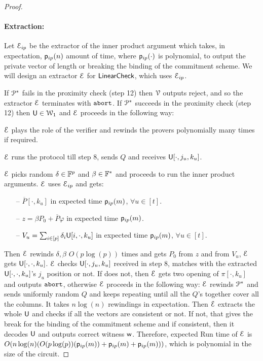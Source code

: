 \begin{proof}
	\smallskip
	\paragraph*{Extraction:} Let $\mathcal{E}_{ip}$ be the extractor of the inner product argument which takes, in expectation, $\mathsf{p}_{ip}(n)$ amount of time, where $\mathsf{p}_{ip}(\cdot)$ is polynomial, to output the private vector of length or breaking the binding of the commitment scheme. We will design an extractor $\mathcal{E}$ for $\mathsf{LinearCheck}$, which uses $\mathcal{E}_{ip}$.
	
	\smallskip
	If $\mathcal{P}^\ast$ fails in the proximity check (step 12) then $\mathcal{V}$ outputs reject, and so the extractor $\mathcal{E}$ terminates with $\texttt{abort}$.
	If $\mathcal{P}^\ast$ succeeds in the proximity check (step 12) then $\mathsf{U}\in \mathcal{W}_1$ and $\mathcal{E}$ proceeds in the following way:
	
	\smallskip
	$\mathcal{E}$ plays the role of the verifier and rewinds the provers polynomially many times if required.
	
	\smallskip
	$\mathcal{E}$ runs the protocol till step 8, sends $Q$ and receives $\mathsf{U}[\cdot, j_u,k_u]$. %
	
	$\mathcal{E}$ picks random $\delta\in \mathbb{F}^p$ and $\beta\in\mathbb{F}^\ast$ and proceeds to run the inner product arguments. $\mathcal{E}$ uses $\mathcal{E}_{ip}$ and gets:
	\begin{itemize}
		\item[--]  $\overline{P}[\cdot,k_u]$ in expected time $\mathsf{p}_{ip}(m)$, $\forall u\in[t]$.
		\item[--] $z=\beta P_0 + \overline{P}\varphi$ in expected time $\mathsf{p}_{ip}(m)$.
		\item[--] $V_u = \sum_{i\in[p]} \delta_i\mathsf{U}[i,\cdot,k_u]$ in expected time $\mathsf{p}_{ip}(m)$, $\forall u\in[t]$.
	\end{itemize}
	Then $\mathcal{E}$ rewinds $\delta, \beta$ $O(p\log(p))$ times and gets $P_0$ from $z$ and from $V_u$, $\mathcal{E}$ gets $\mathsf{U}[\cdot,\cdot,k_u]$. $\mathcal{E}$ checks $\mathsf{U}[\cdot,j_u,k_u]$ received in step 8, matches with the extracted $\mathsf{U}[\cdot,\cdot,k_u]$'s $j_u$ position or not. If does not, then $\mathcal{E}$ gets two opening of $\pi[\cdot,k_u]$ and outputs $\texttt{abort}$, otherwise $\mathcal{E}$ proceeds in the following way: $\mathcal{E}$ rewinds $\mathcal{P}^\ast$ and sends uniformly random $Q$ and keeps repeating until all the $Q$'s together cover all the columns. It takes $n\log(n)$ rewindings in expectation. Then $\mathcal{E}$ extracts the whole $\mathsf{U}$ and checks if all the vectors are consistent or not. If not, that gives the break for the binding of the commitment scheme and if consistent, then it decodes $\mathsf{U}$ and outputs correct witness $\mathsf{w}$.
	\smallskip
	Therefore, expected Run time of $\mathcal{E}$ is $O(n\log(n)(O(p\log(p))(\mathsf{p}_{ip}(m)) + \mathsf{p}_{ip}(m) + \mathsf{p}_{ip}(m))) $, which is polynomial in the size of the circuit.
\end{proof}
